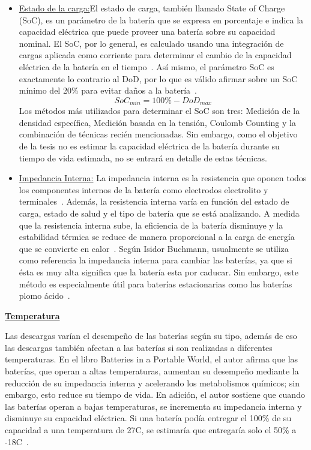 \begin{itemize}

\item \underline{Estado de la carga:}El estado de carga, también llamado State of Charge (SoC), es un parámetro de la batería que se expresa en porcentaje e indica la capacidad eléctrica que puede proveer una batería sobre su capacidad nominal. El SoC, por lo general, es calculado usando una integración de cargas aplicada como corriente para determinar el cambio de la capacidad eléctrica de la batería en el tiempo~\cite{MIT-2008}. Así mismo, el parámetro SoC es exactamente lo contrario al DoD, por lo que es válido afirmar sobre un SoC mínimo del 20\% para evitar daños a la batería~\cite{FerrerAlayeto2011}. \[SoC_{min} = 100\% - DoD_{max}\] Los métodos más utilizados para determinar el SoC son tres: Medición de la densidad específica, Medición basada en la tensión, Coulomb Counting y la combinación de técnicas recién mencionadas. Sin embargo, como el objetivo de la tesis no es estimar la capacidad eléctrica de la batería durante su tiempo de vida estimada, no se entrará en detalle de estas técnicas.

\item \underline{Impedancia Interna:} La impedancia interna es la resistencia que oponen todos los componentes internos de la batería como electrodos electrolito y terminales~\cite{FerrerAlayeto2011}. Además, la resistencia interna varía en función del estado de carga, estado de salud y el tipo de batería que se está analizando. A medida que la resistencia interna sube, la eficiencia de la batería disminuye y la estabilidad térmica se reduce de manera proporcional a la carga de energía que se convierte en calor~\cite{MIT-2008}. Según Isidor Buchmann, usualmente se utiliza como referencia la impedancia interna para cambiar las baterías, ya que si ésta es muy alta significa que la batería esta por caducar. Sin embargo, este método es especialmente útil para baterías estacionarias como las baterías plomo ácido~\cite{Buchmann2011}.

\end{itemize}

\textbf{\underline{Temperatura}}

Las descargas varían el desempeño de las baterías según su tipo, además de eso las descargas también afectan a las baterías si son realizadas a diferentes temperaturas. En el libro Batteries in a Portable World, el autor afirma que las baterías, que operan a altas temperaturas, aumentan su desempeño mediante la reducción de su impedancia interna y acelerando los metabolismos químicos; sin embargo, esto reduce su tiempo de vida. En adición, el autor sostiene que cuando las baterías operan a bajas temperaturas, se incrementa su impedancia interna y disminuye su capacidad eléctrica. Si una batería podía entregar el 100\% de su capacidad a una temperatura de 27\degree C, se estimaría que entregaría solo el 50\% a -18\degree C~\cite{Buchmann2011}. 

